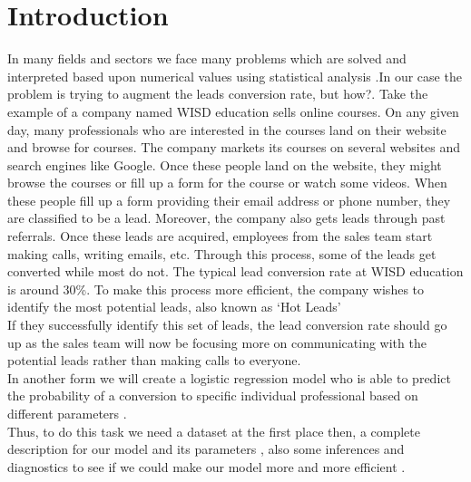 \chapter*{Introduction}

In many fields and sectors we face many problems which are solved and interpreted based upon numerical values using statistical analysis .In our case the problem is trying to augment the leads conversion rate, but how?. Take the example of a company named WISD education sells online courses. On any given day, many professionals who are interested in the courses land on their website and browse for courses. The company markets its courses on several websites and search engines like Google. Once these people land on the website, they might browse the courses or fill up a form for the course or watch some videos. When these people fill up a form providing their email address or phone number, they are classified to be a lead. Moreover, the company also gets leads through past referrals. Once these leads are acquired, employees from the sales team start making calls, writing emails, etc. Through this process, some of the leads get converted while most do not. The typical lead conversion rate at WISD education is around 30\%. To make this process more efficient, the company wishes to identify the most potential leads, also known as ‘Hot Leads’ \\If they successfully identify this set of leads, the lead conversion rate should go up as the sales team will now be focusing more on communicating with the potential leads rather than making calls to everyone.\\ In another form we will create a logistic regression model who is able to predict the probability of a conversion to specific individual professional based on different parameters .
\\Thus, to do this task we need a dataset at the first place then, a complete description for our model and its parameters , also some inferences and diagnostics to see if we could make our model more and more efficient .



